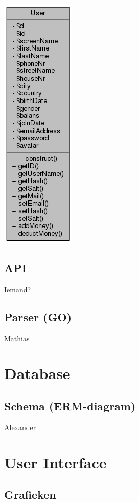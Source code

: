 \documentclass[11pt]{article}
\begin{document}
\includegraphics[scale=0.4]{UML_User.png}

\subsection{API}

Iemand?


\subsection{Parser (GO)}

Mathias




\section{Database}

\subsection{Schema (ERM-diagram)}

Alexander




\section{User Interface}


\subsection{Grafieken}
\end{document}
